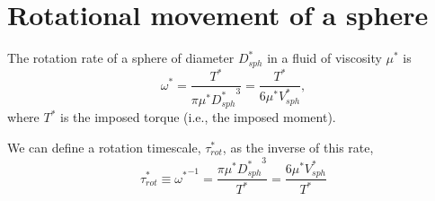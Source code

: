 \documentclass[10pt,a4paper]{article}
\def\non{\nonumber}
\begin{document}
%
%

\section{Rotational movement of a sphere}\label{RotSect}
The rotation rate of a sphere of diameter $D_{sph}^*$ in a fluid of viscosity $\mu^*$ is 
\begin{equation}\label{rot1}
	\omega^* = \frac{T^*}{\pi \mu^* {D_{sph}^*}^3} = \frac{T^*}{6 \mu^* V_{sph}^*},	
\end{equation}
where $T^*$ is the imposed torque (i.e., the imposed moment).

We can define a rotation timescale, $\tau^*_{rot}$, as the inverse of this rate,
\begin{equation}\label{tau1}
	\tau^*_{rot} \equiv {\omega^*}^{-1} = \frac{\pi \mu^* {D_{sph}^*}^3}{T^*} = \frac{6 \mu^* V_{sph}^*}{T^*}
\end{equation}
\end{document}
